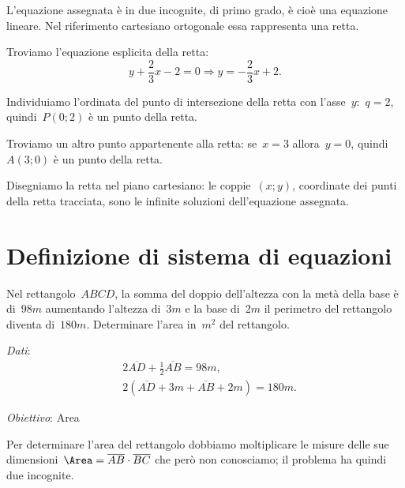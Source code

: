 L'equazione assegnata è in due incognite, di primo
grado, è cioè una equazione lineare. Nel riferimento cartesiano
ortogonale essa rappresenta una retta.

Troviamo l'equazione esplicita della retta:
\[y+\frac{2}{3}x-2=0\Rightarrow y=-{\frac{2}{3}}x+2.\]

Individuiamo l'ordinata del punto di intersezione della
retta con l'asse~$y$:~$q=2$, quindi~$P(0;2)$ è un
punto della retta.

Troviamo un altro punto appartenente alla retta: se~$x=3$ allora~$y=0$,
quindi~$A(3;0)$ è un punto della retta.

Disegniamo la retta nel piano cartesiano: le coppie~$(x;y)$, coordinate
dei punti della retta tracciata, sono le infinite soluzioni
dell'equazione assegnata.\vspace{1.10ex}


\section{Definizione di sistema di equazioni}
\label{sec:sist_definizione}

\begin{problema}
\label{pr:22.1}
Nel rettangolo~$ABCD$, la somma del doppio dell'altezza con la metà della base
è di~$98\unit{m}$ aumentando l'altezza di~$3\unit{m}$ e la base di~$2\unit{m}$ 
il perimetro del rettangolo diventa di~$180\unit{m}$. 
Determinare l'area in~$\unit{m}^{2}$ del rettangolo.
\end{problema}
\begin{multicols}{2}
\emph{Dati}:
\begin{align*}
&2\overline{AD}+\frac{1}{2}\overline{AB}=98\unit{m},\\
&2(\overline{AD}+3m+\overline{AB}+2m)=180\unit{m}.
\end{align*}

\emph{Obiettivo}: Area

\begin{center}
\begin{inaccessibleblock}
 
 \end{inaccessibleblock}
\end{center}
\end{multicols}

Per determinare l'area del rettangolo dobbiamo moltiplicare le misure 
delle sue dimensioni~$\Area=\overline{AB}\cdot\overline{BC}$
che però non conosciamo; il problema ha quindi due incognite.

